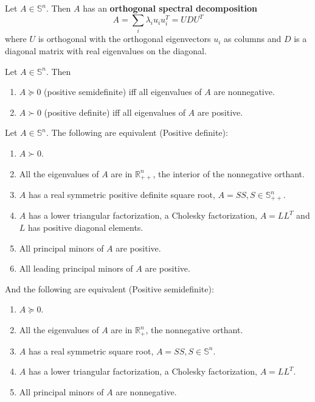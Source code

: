 \begin{theorem}
  Let $A \in \mathbb S^n$. Then $A$ has an \textbf{orthogonal spectral decomposition}
  $$A = \sum_i \lambda_i u_i u_i^T = UDU^T$$ where $U$ is orthogonal with the orthogonal eigenvectors $u_i$ as columns and $D$ is a diagonal matrix with real eigenvalues on the diagonal.
\end{theorem}
\begin{corollary}
  Let $A \in \mathbb S^n$. Then
  \begin{enumerate}
    \item $A \succeq 0$ (positive semidefinite) iff all eigenvalues of $A$ are nonnegative.
    \item $A \succ 0$ (positive definite) iff all eigenvalues of $A$ are positive.
  \end{enumerate}
\end{corollary}
\begin{proposition}
  Let $A \in \mathbb S^n$. The following are equivalent (Positive definite):
  \begin{enumerate}
    \item $A \succ 0$.
    \item All the eigenvalues of $A$ are in $\mathbb R^n_{++}$, the interior of the nonnegative orthant.
    \item $A$ has a real symmetric positive definite square root, $A = SS, S \in \mathbb S^n_{++}$.
    \item $A$ has a lower triangular factorization, a Cholesky factorization, $A = LL^T$ and $L$ has positive diagonal elements.
    \item All principal minors of $A$ are positive.
    \item All leading principal minors of $A$ are positive.
  \end{enumerate}
  And the following are equivalent (Positive semidefinite):
  \begin{enumerate}
    \item $A \succeq 0$.
    \item All the eigenvalues of $A$ are in $\mathbb R^n_{+}$, the nonnegative orthant.
    \item $A$ has a real symmetric square root, $A = SS, S \in \mathbb S^n$.
    \item $A$ has a lower triangular factorization, a Cholesky factorization, $A = LL^T$.
    \item All principal minors of $A$ are nonnegative.
  \end{enumerate}
\end{proposition}
